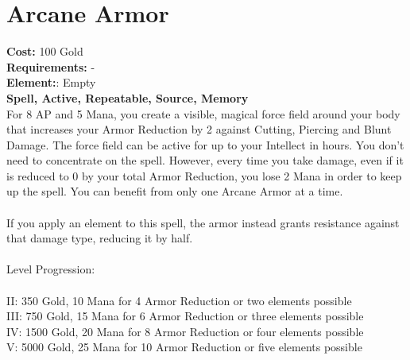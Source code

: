 \section*{Arcane Armor}
\textbf{Cost:} 100 Gold\\
\textbf{Requirements:} -\\
\textbf{Element:}: Empty\\
\textbf{Spell, Active, Repeatable, Source, Memory}\\
For 8 AP and 5 Mana, you create a visible, magical force field around your body that increases your Armor Reduction by 2 against Cutting, Piercing and Blunt Damage. The force field can be active for up to your Intellect in hours. You don’t need to concentrate on the spell. However, every time you take damage, even if it is reduced to 0 by your total Armor Reduction, you lose 2 Mana in order to keep up the spell. You can benefit from only one Arcane Armor at a time.\\
\\
If you apply an element to this spell, the armor instead grants resistance against that damage type, reducing it by half.\\
\\
Level Progression:\\
\\
II: 350 Gold, 10 Mana for 4 Armor Reduction or two elements possible\\
III: 750 Gold, 15 Mana for 6 Armor Reduction or three elements possible\\
IV: 1500 Gold, 20 Mana for 8 Armor Reduction or four elements possible\\
V: 5000 Gold, 25 Mana for 10 Armor Reduction or five elements possible\\